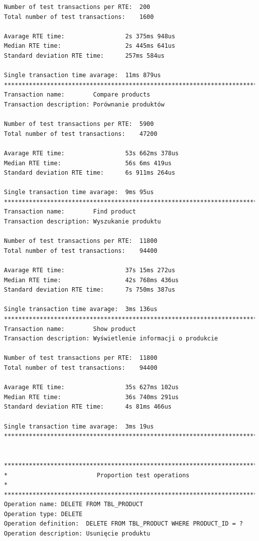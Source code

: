\begin{Verbatim}
Number of test transactions per RTE:  200
Total number of test transactions:    1600

Avarage RTE time:                 2s 375ms 948us
Median RTE time:                  2s 445ms 641us
Standard deviation RTE time:      257ms 584us

Single transaction time avarage:  11ms 879us
*********************************************************************************
Transaction name:        Compare products
Transaction description: Porównanie produktów

Number of test transactions per RTE:  5900
Total number of test transactions:    47200

Avarage RTE time:                 53s 662ms 378us
Median RTE time:                  56s 6ms 419us
Standard deviation RTE time:      6s 911ms 264us

Single transaction time avarage:  9ms 95us
*********************************************************************************
Transaction name:        Find product
Transaction description: Wyszukanie produktu

Number of test transactions per RTE:  11800
Total number of test transactions:    94400

Avarage RTE time:                 37s 15ms 272us
Median RTE time:                  42s 768ms 436us
Standard deviation RTE time:      7s 750ms 387us

Single transaction time avarage:  3ms 136us
*********************************************************************************
Transaction name:        Show product
Transaction description: Wyświetlenie informacji o produkcie

Number of test transactions per RTE:  11800
Total number of test transactions:    94400

Avarage RTE time:                 35s 627ms 102us
Median RTE time:                  36s 740ms 291us
Standard deviation RTE time:      4s 81ms 466us

Single transaction time avarage:  3ms 19us
*********************************************************************************


*********************************************************************************
*                         Proportion test operations                            *
*********************************************************************************
Operation name: DELETE FROM TBL_PRODUCT
Operation type: DELETE
Operation definition:  DELETE FROM TBL_PRODUCT WHERE PRODUCT_ID = ?
Operation description: Usunięcie produktu


\end{Verbatim}
